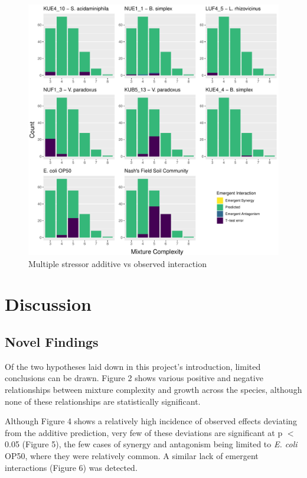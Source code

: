 \documentclass[final,1p,times]{elsarticle}
\begin{document}
\begin{figure}[H]
    \centering
    \includegraphics[width = \textwidth]{Scripts/Results/Final_Pipeline/histogram_interaction_emergent.pdf}
    \caption{Multiple stressor additive vs observed interaction}
    \label{fig:histogram_interaction_emergent}
\end{figure}

\newpage
\section{Discussion}
\label{S:4}

\subsection{Novel Findings}
\label{S:4:1}

Of the two hypotheses laid down in this project’s introduction, limited conclusions can be drawn. Figure 2 shows various positive and negative relationships between mixture complexity and growth across the species, although none of these relationships are statistically significant. 

Although Figure 4 shows a relatively high incidence of observed effects deviating from the additive prediction, very few of these deviations are significant at p $<$ 0.05 (Figure 5), the few cases of synergy and antagonism being limited to \textit{E. coli} OP50, where they were relatively common. A similar lack of emergent interactions (Figure 6) was detected. 
\end{document}
